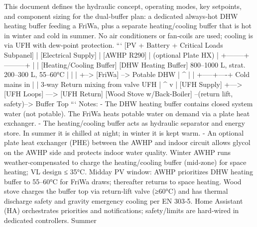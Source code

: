 \markdownRendererDocumentBegin
\markdownRendererSectionBegin
{}\markdownRendererInterblockSeparator
{}This document defines the hydraulic concept, operating modes, key setpoints, and component sizing for the dual‑buffer plan: a dedicated always‑hot DHW heating buffer feeding a FriWa, plus a separate heating/cooling buffer that is hot in winter and cold in summer. No air conditioners or fan‑coils are used; cooling is via UFH with dew‑point protection.\markdownRendererInterblockSeparator
{}\markdownRendererSectionBegin
{}\markdownRendererInterblockSeparator
{}``` [PV + Battery + Critical Loads Subpanel] | [Electrical Supply] | [AWHP R290] | (optional Plate HX) | +--------+---------+ | | [Heating/Cooling Buffer]   [DHW Heating Buffer] 800–1000 L, strat. 200–300 L, 55–60°C | | | +--> [FriWa] --> Potable DHW | ^ | | +-----+----+ Cold mains in | | 3‑way Return mixing from valve UFH | ^ v | [UFH Supply] +---> [UFH Loops] ---> [UFH Return]\markdownRendererInterblockSeparator
{}[Wood Stove w/Back‑Boiler] --(return lift, safety)--> Buffer Top ```\markdownRendererInterblockSeparator
{}Notes: - The DHW heating buffer contains closed system water (not potable). The FriWa heats potable water on demand via a plate heat exchanger. - The heating/cooling buffer acts as hydraulic separator and energy store. In summer it is chilled at night; in winter it is kept warm. - An optional plate heat exchanger (PHE) between the AWHP and indoor circuit allows glycol on the AWHP side and protects indoor water quality.\markdownRendererInterblockSeparator
{}
\markdownRendererSectionEnd \markdownRendererSectionBegin
{}\markdownRendererInterblockSeparator
{}\markdownRendererUlBegin
\markdownRendererUlItem Winter\markdownRendererUlItemEnd 
\markdownRendererUlItem AWHP runs weather‑compensated to charge the heating/cooling buffer (mid‑zone) for space heating; VL design ≤ 35°C.\markdownRendererUlItemEnd 
\markdownRendererUlItem Midday PV window: AWHP prioritizes DHW heating buffer to 55–60°C for FriWa draws; thereafter returns to space heating.\markdownRendererUlItemEnd 
\markdownRendererUlItem Wood stove charges the buffer top via return‑lift valve (≥60°C) and has thermal discharge safety and gravity emergency cooling per EN 303‑5.\markdownRendererUlItemEnd 
\markdownRendererUlItem Home Assistant (HA) orchestrates priorities and notifications; safety/limits are hard‑wired in dedicated controllers.\markdownRendererUlItemEnd 
\markdownRendererUlItem Summer\markdownRendererUlItemEnd 
